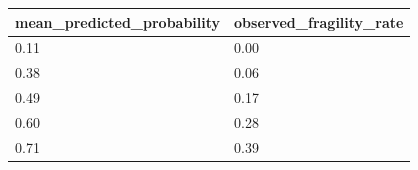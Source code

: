 \begin{tabular}{ll}
\toprule
mean\_predicted\_probability & observed\_fragility\_rate \\
\midrule
0.11 & 0.00 \\
0.38 & 0.06 \\
0.49 & 0.17 \\
0.60 & 0.28 \\
0.71 & 0.39 \\
\bottomrule
\end{tabular}
